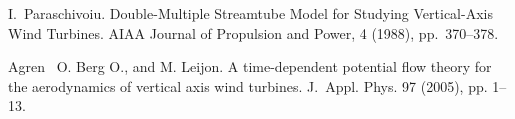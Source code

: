
\begin{thebibliography}{10}
{\sc I.~Paraschivoiu}. {Double-Multiple Streamtube Model for Studying Vertical-Axis Wind Turbines}. AIAA Journal of Propulsion and Power, 4 (1988), pp.~370--378.

{\sc Agren ~O. Berg O., and M. Leijon}. {A time-dependent potential flow theory for the aerodynamics of vertical axis wind turbines}. J.~Appl. Phys. 97 (2005), pp. 1--13.
\end{thebibliography}